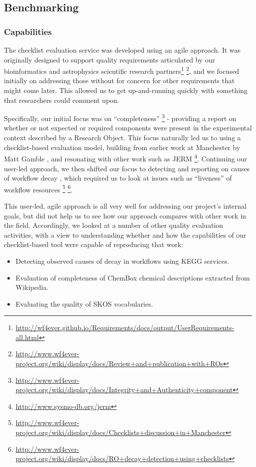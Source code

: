 \subsection{Benchmarking}

\subsubsection{Capabilities}

The checklist evaluation service was developed using an agile approach.
It was originally designed to support quality requirements articulated
by our bioinformatics and astrophysics scientific research
partners\footnote{\url{http://wf4ever.github.io/Requirements/docs/output/UserRequirements-all.html}}
\footnote{\url{http://www.wf4ever-project.org/wiki/display/docs/Review+and+publication+with+ROs}},
and we focused initially on addressing those without for concern for
other requirements that might come later. This allowed us to get
up-and-running quickly with something that researchers could comment
upon.

Specifically, our initial focus was on ``completeness'' \footnote{\url{http://www.wf4ever-project.org/wiki/display/docs/Integrity+and+Authenticity+component}}
- providing a report on whether or not expected or required components
were present in the experimental context described by a Research Object.
This focus naturally led us to using a checklist-based evaluation model,
building from earlier work at Manchester by Matt Gamble
\cite{Gamble-2011}, and resonating with other work such as JERM
\footnote{\url{http://www.sysmo-db.org/jerm}}. Continuing our user-led
approach, we then shifted our focus to detecting and reporting on causes
of workflow decay \cite{Zhao-2012}, which required us to look at issues
such as ``liveness'' of workflow resources \footnote{\url{http://www.wf4ever-project.org/wiki/display/docs/Checklists+discussion+in+Manchester}}
\footnote{\url{http://www.wf4ever-project.org/wiki/display/docs/RO+decay+detection+using+checklists}}.

This user-led, agile approach is all very well for addressing our
project's internal goals, but did not help us to see how our approach
compares with other work in the field. Accordingly, we looked at a
number of other quality evaluation activities, with a view to
understanding whether and how the capabilities of our checklist-based
tool were capable of reproducing that work:

\begin{itemize}
\itemsep1pt\parskip0pt
\item
  Detecting observed causes of decay in workflows using KEGG services.
\item
  Evaluation of completeness of ChemBox chemical descriptions extracted
  from Wikipedia.
\item
  Evaluating the quality of SKOS vocabularies.
\end{itemize}

